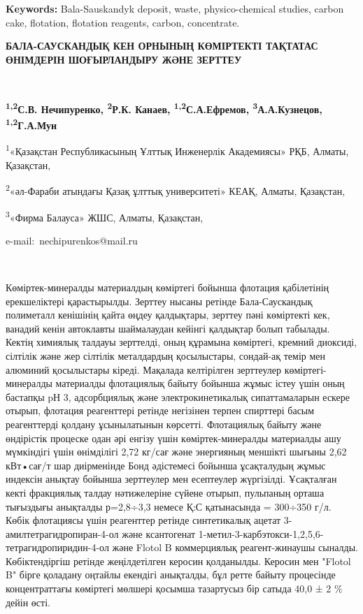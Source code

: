 \textbf{Keywords:} Bala-Sauskandyk deposit, waste, physico-chemical
studies, carbon cake, flotation, flotation reagents, carbon,
concentrate.

\textbf{БАЛА-САУСКАНДЫҚ КЕН ОРНЫНЫҢ КӨМІРТЕКТІ ТАҚТАТАС ӨНІМДЕРІН
ШОҒЫРЛАНДЫРУ ЖӘНЕ ЗЕРТТЕУ}

~

\textbf{\textsuperscript{1,2}С.В. Нечипуренко, \textsuperscript{2}Р.К.
Канаев, \textsuperscript{1,2}С.А.Ефремов,
\textsuperscript{3}А.А.Кузнецов, \textsuperscript{1,2}Г.А.Мун}

\textsuperscript{1}«Қазақстан Республикасының Ұлттық Инженерлік
Академиясы» РҚБ, Алматы, Қазақстан,

\textsuperscript{2}«әл-Фараби атындағы Қазақ ұлттық университеті» КЕАҚ,
Алматы, Қазақстан,

\textsuperscript{3}«Фирма Балауса» ЖШС, Алматы, Қазақстан,

e-mail:~nechipurenkos@mail.ru

~

Көміртек-минералды материалдың көміртегі бойынша флотация қабілетінің
ерекшеліктері қарастырылды. Зерттеу нысаны ретінде Бала-Саускандық
полиметалл кенішінің қайта өңдеу қалдықтары, зерттеу пәні көміртекті
кек, ванадий кенін автоклавты шаймалаудан кейінгі қалдықтар болып
табылады. Кектің химиялық талдауы зерттелді, оның құрамына көміртегі,
кремний диоксиді, сілтілік және жер сілтілік металдардың қосылыстары,
сондай-ақ темір мен алюминий қосылыстары кіреді. Мақалада келтірілген
зерттеулер көміртегі-минералды материалды флотациялық байыту бойынша
жұмыс істеу үшін оның бастапқы pН 3, адсорбциялық және
электрокинетикалық сипаттамаларын ескере отырып, флотация реагенттері
ретінде негізінен терпен спирттері басым реагенттерді қолдану
ұсынылатынын көрсетті. Флотациялық байыту және өндірістік процеске одан
әрі енгізу үшін көміртек-минералды материалды ашу мүмкіндігі үшін
өнімділігі 2,72 кг/сағ және энергияның меншікті шығыны 2,62 кВт•сағ/т
шар диірменінде Бонд әдістемесі бойынша ұсақталудың жұмыс индексін
анықтау бойынша зерттеулер мен есептеулер жүргізілді. Ұсақталған кекті
фракциялық талдау нәтижелеріне сүйене отырып, пульпаның орташа тығыздығы
анықталды р=2,8÷3,3 немесе Қ:С қатынасында = 300÷350 г/л. Көбік
флотациясы үшін реагенттер ретінде синтетикалық ацетат
3-амилтетрагидропиран-4-ол және ксантогенат
1-метил-3-карбэтокси-1,2,5,6-тетрагидропиридин-4-ол және Flotol B
коммерциялық реагент-жинаушы сыналды. Көбіктендіргіш ретінде
жеңілдетілген керосин қолданылды. Керосин мен "Flotol B" бірге қоладану
оңтайлы екендігі анықталды, бұл ретте байыту процесінде концентраттағы
көміртегі мөлшері қосымша тазартусыз бір сатыда 40,0 ± 2 \% дейін өсті.

